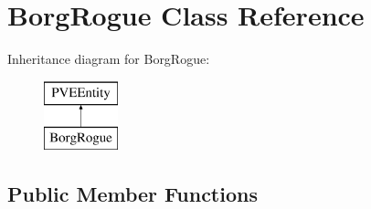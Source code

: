 \hypertarget{classBorgRogue}{
\section{BorgRogue Class Reference}
\label{db/d4f/classBorgRogue}
}
Inheritance diagram for BorgRogue:\begin{figure}[H]
\begin{center}
\leavevmode
\includegraphics[height=2cm]{db/d4f/classBorgRogue}
\end{center}
\end{figure}
\subsection*{Public Member Functions}
